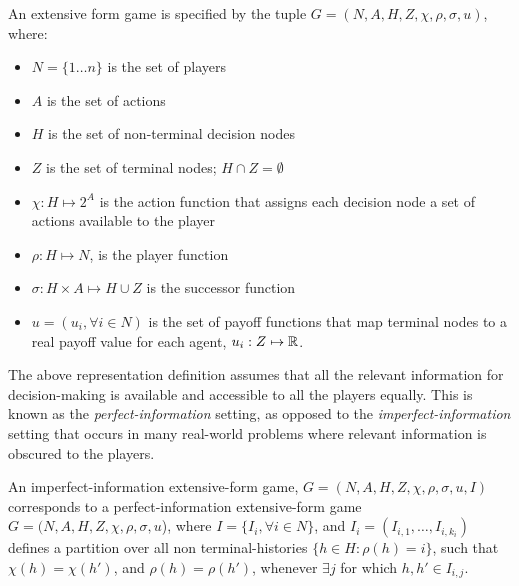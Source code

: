 \begin{definition}
	An extensive form game is specified by the tuple $G=(N, A, H, Z, \chi, \rho, \sigma, u)$, where:
	\begin{itemize}
		\item $N = \{1 \dots n \}$ is the set of players
		\item $A$ is the set of actions
		\item $H$ is the set of non-terminal decision nodes
		\item $Z$ is the set of terminal nodes; $H \cap Z = \emptyset$
		\item $\chi: H \mapsto 2^A$ is the action function that assigns each decision node a set of actions available to the player
		\item $\rho: H \mapsto N$, is the player function
		\item $\sigma: H \times A \mapsto H \cup Z$ is the successor function
		\item $u = (u_i,
			      \forall i \in N)$ is the set of payoff functions that map terminal nodes to a real payoff value
		      for each agent, $u_i: Z \mapsto \mathbb{R}$.
	\end{itemize}
\end{definition}

The above representation definition assumes that all the relevant information for decision-making is
available and accessible to all the players equally.
This is known as the \textit{perfect-information} setting, as opposed to the
\textit{imperfect-information} setting that occurs in many real-world problems where relevant
information is obscured to the players.

\begin{definition}
	An imperfect-information extensive-form game, $G=(N, A, H, Z, \chi, \rho, \sigma, u, I)$ corresponds to a
	perfect-information extensive-form game $G=(N, A, H, Z, \chi, \rho, \sigma, u$), where
	$I = \{I_i, \forall i \in N\}$, and $I_i = (I_{i,1}, \dots, I_{i,k_i})$ defines a partition over all non terminal-histories
	$\{h \in H : \rho(h) = i\}$, such that
	$\chi(h) = \chi(h')$, and $\rho(h)=\rho(h')$, whenever $\exists j$ for which $h,h' \in I_{i,j}$.
\end{definition}

